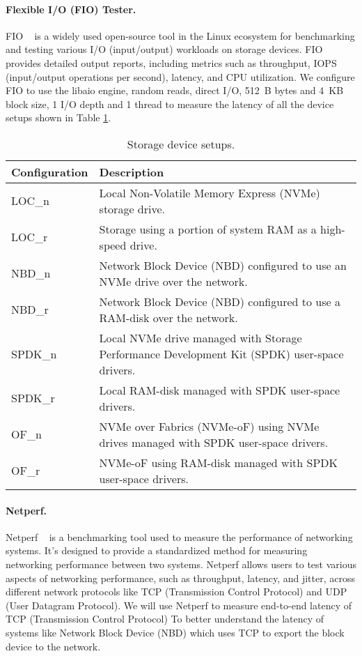 \paragraph{Flexible I/O (FIO) Tester.}
FIO ~\cite{fio} is a widely used open-source tool in the Linux ecosystem for benchmarking
and testing various I/O (input/output) workloads on storage devices. FIO
provides detailed output reports, including metrics such as throughput, IOPS
(input/output operations per second), latency, and CPU utilization. We configure FIO to use the
libaio engine, random reads, direct I/O, \SI{512}{B} bytes and \SI{4}{KB} block size, 1 I/O
depth and 1 thread to measure the latency of all the device setups shown in Table
\ref{tab:storage_configurations}. 

\begin{table}[h!]
\centering
\begin{tabular}{|>{\centering\arraybackslash}m{3cm}|>{\RaggedRight\arraybackslash}m{5cm}|}
\hline
\textbf{Configuration} & \textbf{Description} \\
\hline
LOC\_n & Local Non-Volatile Memory Express (NVMe) storage drive. \\
\hline
LOC\_r & Storage using a portion of system RAM as a high-speed drive. \\
\hline
NBD\_n & Network Block Device (NBD) configured to use an NVMe drive over the network. \\
\hline
NBD\_r & Network Block Device (NBD) configured to use a RAM-disk over the network. \\
\hline
SPDK\_n & Local NVMe drive managed with Storage Performance Development Kit (SPDK) user-space drivers. \\
\hline
SPDK\_r & Local RAM-disk managed with SPDK user-space drivers. \\
\hline
OF\_n & NVMe over Fabrics (NVMe-oF) using NVMe drives managed with SPDK user-space drivers. \\
\hline
OF\_r & NVMe-oF using RAM-disk managed with SPDK user-space drivers. \\
\hline
\end{tabular}
\caption{Storage device setups.}
\label{tab:storage_configurations}
\end{table}





\paragraph{Netperf.} 
Netperf ~\cite{netperf} is a benchmarking tool used to measure the performance of networking
systems. It's designed to provide a standardized method for measuring networking
performance between two systems. Netperf allows users to test various aspects of
networking performance, such as throughput, latency, and jitter, across
different network protocols like TCP (Transmission Control Protocol) and UDP
(User Datagram Protocol). We will use Netperf to measure end-to-end latency of
TCP (Transmission Control Protocol) To better understand the latency of systems
like Network Block Device (NBD) which uses TCP to export the block device to the
network.

